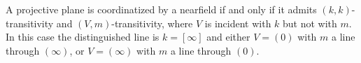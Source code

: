 A projective plane is coordinatized by a nearfield if and only if it admits $(k,k)$-transitivity and $(V,m)$-transitivity, where $V$ is incident with $k$ but not with $m$. In this case the distinguished line is $k = [\infty]$ and either $V = (0)$ with $m$ a line through $(\infty)$, or $V = (\infty)$ with $m$ a line through $(0)$.
